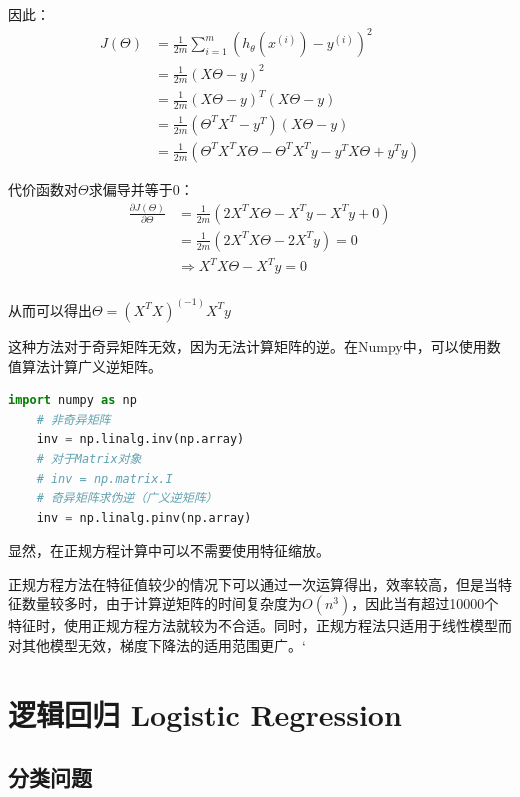 \documentclass[12pt, a4paper]{article}
\begin{document}
因此：
\begin{align*}
    J(\Theta) & = \frac{1}{2m}\sum_{i=1}^{m}(h_\theta(x^{(i)})-y^{(i)})^2       \\
              & = \frac{1}{2m}(X\Theta-y)^2                                     \\
              & = \frac{1}{2m}(X\Theta-y)^T(X\Theta-y)                          \\
              & = \frac{1}{2m}(\Theta^TX^T-y^T)(X\Theta-y)                      \\
              & = \frac{1}{2m}(\Theta^TX^TX\Theta-\Theta^TX^Ty-y^TX\Theta+y^Ty)
\end{align*}

代价函数对$\Theta$求偏导并等于0：
\begin{align*}
    \frac{\partial J(\Theta)}{\partial\Theta} & = \frac{1}{2m}(2X^TX\Theta-X^Ty-X^Ty+0) \\
                                              & = \frac{1}{2m}(2X^TX\Theta-2X^Ty) = 0   \\
                                              & \Rightarrow X^TX\Theta-X^Ty=0           \\
\end{align*}

从而可以得出$\Theta=(X^TX)^{(-1)}X^Ty$

这种方法对于奇异矩阵无效，因为无法计算矩阵的逆。在Numpy中，可以使用数值算法计算广义逆矩阵。

\begin{lstlisting}[language=Python]
    import numpy as np
    # 非奇异矩阵
    inv = np.linalg.inv(np.array)
    # 对于Matrix对象
    # inv = np.matrix.I
    # 奇异矩阵求伪逆（广义逆矩阵）
    inv = np.linalg.pinv(np.array)
\end{lstlisting}

显然，在正规方程计算中可以不需要使用特征缩放。

正规方程方法在特征值较少的情况下可以通过一次运算得出，效率较高，但是当特征数量较多时，由于计算逆矩阵的时间复杂度为$O(n^3)$，因此当有超过10000个特征时，使用正规方程方法就较为不合适。同时，正规方程法只适用于线性模型而对其他模型无效，梯度下降法的适用范围更广。‘

\section{逻辑回归 Logistic Regression}

\subsection{分类问题}
\end{document}
